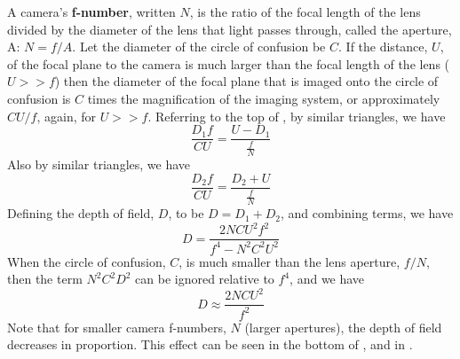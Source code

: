 A camera's {\bf f-number}, written $N$, is the ratio of the focal length of the lens divided by the diameter of the lens that light passes through, called the aperture, A:  $N = f/A$.  Let the diameter of the circle of confusion be $C$.  If the distance, $U$, of the focal plane to the camera is much larger than the focal length of the lens ($U >> f$)
then the diameter of the focal plane that is imaged onto the circle of confusion is $C$ times the magnification of the imaging system, or approximately $C U/f$, again, for $U >> f$.  Referring to the top of  \fig{\ref{fig:circleOfConfusion}}, by similar triangles, we have 
\begin{equation}
    \frac{D_1 f}{C U} = 
    \frac{U - D_1}{\frac{f}{N}}
\end{equation}
Also by similar triangles, we have
\begin{equation}
    \frac{D_2 f}{C U} =
    \frac{D_2+U}{\frac{f}{N}}
\end{equation}
Defining the depth of field, $D$, to be $D = D_1 + D_2$, and combining terms, we have
\begin{equation}
    D = \frac{2 N C U^2 f^2}{f^4 - N^2 C^2 U^2}
\end{equation}
When the circle of confusion, $C$,  is much smaller than the lens aperture, $f/N$, then the term $N^2 C^2 D^2$ can be ignored relative to $f^4$, and we have
\begin{equation}
    D \approx \frac{2 N C U^2}{f^2}
\end{equation}
Note that for smaller camera f-numbers, $N$ (larger apertures), the depth of field decreases in proportion.  This effect can be seen in the bottom of \fig{\ref{fig:DOFformula}}, and in \fig{\ref{fig:rulers}}.





